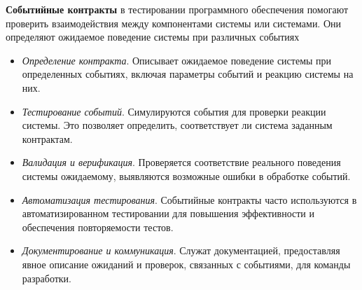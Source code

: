 \textbf{Событийные контракты} в тестировании программного обеспечения помогают проверить взаимодействия между компонентами системы или системами. Они определяют ожидаемое поведение системы при различных событиях

\begin{itemize}
    \item \textit{Определение контракта}. Описывает ожидаемое поведение системы при определенных событиях, включая параметры событий и реакцию системы на них.
    \item \textit{Тестирование событий}. Симулируются события для проверки реакции системы. Это позволяет определить, соответствует ли система заданным контрактам.

    \item \textit{Валидация и верификация}. Проверяется соответствие реального поведения системы ожидаемому, выявляются возможные ошибки в обработке событий.

    \item \textit{Автоматизация тестирования}. Событийные контракты часто используются в автоматизированном тестировании для повышения эффективности и обеспечения повторяемости тестов.

    \item \textit{Документирование и коммуникация}. Служат документацией, предоставляя явное описание ожиданий и проверок, связанных с событиями, для команды разработки.
\end{itemize}